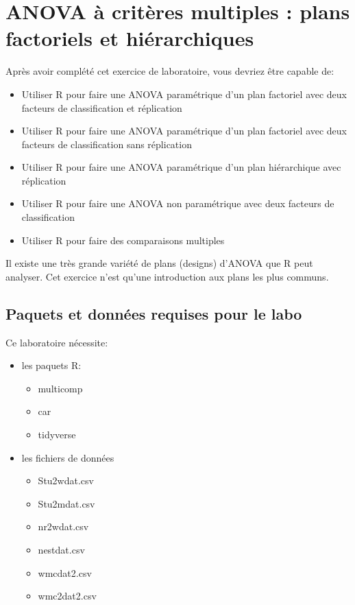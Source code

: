 \documentclass[
  12pt,
]{book}
\providecommand{\tightlist}{%
  \setlength{\itemsep}{0pt}\setlength{\parskip}{0pt}}
\begin{document}
\hypertarget{anova-uxe0-crituxe8res-multiples-plans-factoriels-et-hiuxe9rarchiques}{%
\chapter{ANOVA à critères multiples : plans factoriels et hiérarchiques}\label{anova-uxe0-crituxe8res-multiples-plans-factoriels-et-hiuxe9rarchiques}}

Après avoir complété cet exercice de laboratoire, vous devriez être
capable de:

\begin{itemize}
\tightlist
\item
  Utiliser R pour faire une ANOVA paramétrique d'un plan factoriel avec deux facteurs de classification et réplication
\item
  Utiliser R pour faire une ANOVA paramétrique d'un plan factoriel avec deux facteurs de classification sans réplication
\item
  Utiliser R pour faire une ANOVA paramétrique d'un plan hiérarchique avec réplication
\item
  Utiliser R pour faire une ANOVA non paramétrique avec deux facteurs de classification
\item
  Utiliser R pour faire des comparaisons multiples
\end{itemize}

Il existe une très grande variété de plans (designs) d'ANOVA que R peut analyser. Cet exercice n'est qu'une introduction aux plans les plus communs.

\hypertarget{set-anomul}{%
\section{Paquets et données requises pour le labo}\label{set-anomul}}

Ce laboratoire nécessite:

\begin{itemize}
\tightlist
\item
  les paquets R:

  \begin{itemize}
  \tightlist
  \item
    multicomp
  \item
    car
  \item
    tidyverse
  \end{itemize}
\item
  les fichiers de données

  \begin{itemize}
  \tightlist
  \item
    Stu2wdat.csv
  \item
    Stu2mdat.csv
  \item
    nr2wdat.csv
  \item
    nestdat.csv
  \item
    wmcdat2.csv
  \item
    wmc2dat2.csv
  \end{itemize}
\end{itemize}
\end{document}
